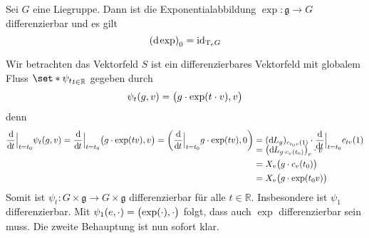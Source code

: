 \begin{lemma}[label=lem:129,{name=[{Differenzierbarkeit der Exponentialabbildung}]}]
	Sei $G$ eine Liegruppe.
	Dann ist die Exponentialabbildung $\exp \colon \mathfrak{g} \to G$ differenzierbar und es gilt 
	\[
		\enbrace*{\mathd \exp}_0 = \id_{\Tmap_e G}
	\]
\end{lemma}
\begin{beweis}
	Wir betrachten das Vektorfeld
	$S$ ist ein differenzierbares Vektorfeld mit globalem Fluss $\set*{\psi_t}_{t \in \mathbb{R}}$ gegeben durch 
	\[
		\psi_t(g,v) = \enbrace[\big]{g \cdot \exp(t \cdot v),v}
	\]
	denn
	\begin{align}
		\diffd{}{t}\Big|_{t=t_0} \psi_t (g,v) = \diffd{}{t}\Big|_{t=t_0} \enbrace[\big]{g \cdot \exp(tv),v} = \enbrace*{\diffd{}{t}\Big|_{t=t_0} g \cdot \exp(tv),0} &= (\mathd L_g)_{c_{t_0 v}(1)} \cdot \diffd{}{t}\Big|_{t=t_0} c_{tv}(1) \\[-11pt]
		&= \enbrace*{\mathd L_{g \cdot c_v(t_0)}}_e \cdot v \\
		&= X_v \enbrace[\big]{g \cdot c_v(t_0)} \\
		&= X_v\enbrace[\big]{g \cdot \exp(t_0 v)}
	\end{align}
	Somit ist $\psi_t \colon G \times \mathfrak{g} \to G \times \mathfrak{g}$ differenzierbar für alle $t \in \mathbb{R}$.
	Insbesondere ist $\psi_1$ differenzierbar.
	Mit $\psi_1(e,\cdot ) = \enbrace[\big]{\exp(\cdot ), \cdot }$ folgt, dass auch $\exp$ differenzierbar sein muss.
	Die zweite Behauptung ist nun sofort klar.
\end{beweis}

